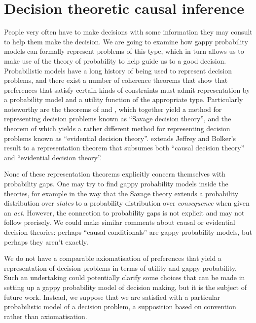 
\section{Decision theoretic causal inference}\label{sec:seedo_models}

People very often have to make decisions with some information they may consult to help them make the decision. We are going to examine how gappy probability models can formally represent problems of this type, which in turn allows us to make use of the theory of probability to help guide us to a good decision. Probabilistic models have a long history of being used to represent decision problems, and there exist a number of coherence theorems that show that preferences that satisfy certain kinds of constraints must admit representation by a probability model and a utility function of the appropriate type. Particularly noteworthy are the theorems of \citet{ramsey_truth_2016} and \citet{savage_foundations_1954}, which together yield a method for representing decision problems known as ``Savage decision theory'', and the theorem of \citet{bolker_functions_1966,jeffrey_logic_1990} which yields a rather different method for representing decision problems known as ``evidential decision theory''. \citet{joyce_foundations_1999} extends Jeffrey and Bolker's result to a representation theorem that subsumes both ``causal decision theory'' and ``evidential decision theory''.

None of these representation theorems explicitly concern themselves with probability gaps. One may try to find gappy probability models inside the theories, for example in the way that the Savage theory extends a probability distribution over \emph{states} to a probability distribution over \emph{consequence} when given an \emph{act}. However, the connection to probability gaps is not explicit and may not follow precisely. We could make similar comments about causal or evidential decision theories: perhaps ``causal conditionals'' are gappy probability models, but perhaps they aren't exactly.

We do not have a comparable axiomatisation of preferences that yield a representation of decision problems in terms of utility and gappy probability. Such an undertaking could potentially clarify some choices that can be made in setting up a gappy probability model of decision making, but it is the subject of future work. Instead, we suppose that we are satisfied with a particular probabilistic model of a decision problem, a supposition based on convention rather than axiomatisation.

